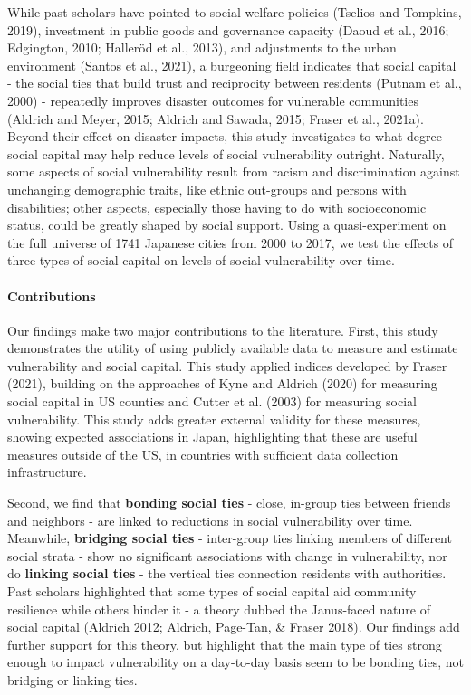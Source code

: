 \documentclass[]{elsarticle} %
\begin{document}
While past scholars have pointed to social welfare policies (Tselios and
Tompkins, 2019), investment in public goods and governance capacity
(Daoud et al., 2016; Edgington, 2010; Halleröd et al., 2013), and
adjustments to the urban environment (Santos et al., 2021), a burgeoning
field indicates that social capital - the social ties that build trust
and reciprocity between residents (Putnam et al., 2000) - repeatedly
improves disaster outcomes for vulnerable communities (Aldrich and
Meyer, 2015; Aldrich and Sawada, 2015; Fraser et al., 2021a). Beyond
their effect on disaster impacts, this study investigates to what degree
social capital may help reduce levels of social vulnerability outright.
Naturally, some aspects of social vulnerability result from racism and
discrimination against unchanging demographic traits, like ethnic
out-groups and persons with disabilities; other aspects, especially
those having to do with socioeconomic status, could be greatly shaped by
social support. Using a quasi-experiment on the full universe of 1741
Japanese cities from 2000 to 2017, we test the effects of three types of
social capital on levels of social vulnerability over time.

\hypertarget{contributions}{%
\paragraph{Contributions}\label{contributions}}

Our findings make two major contributions to the literature. First, this
study demonstrates the utility of using publicly available data to
measure and estimate vulnerability and social capital. This study
applied indices developed by Fraser (2021), building on the approaches
of Kyne and Aldrich (2020) for measuring social capital in US counties
and Cutter et al. (2003) for measuring social vulnerability. This study
adds greater external validity for these measures, showing expected
associations in Japan, highlighting that these are useful measures
outside of the US, in countries with sufficient data collection
infrastructure.

Second, we find that \textbf{bonding social ties} - close, in-group ties
between friends and neighbors - are linked to reductions in social
vulnerability over time. Meanwhile, \textbf{bridging social ties} -
inter-group ties linking members of different social strata - show no
significant associations with change in vulnerability, nor do
\textbf{linking social ties} - the vertical ties connection residents
with authorities. Past scholars highlighted that some types of social
capital aid community resilience while others hinder it - a theory
dubbed the Janus-faced nature of social capital (Aldrich 2012; Aldrich,
Page-Tan, \& Fraser 2018). Our findings add further support for this
theory, but highlight that the main type of ties strong enough to impact
vulnerability on a day-to-day basis seem to be bonding ties, not
bridging or linking ties.
\end{document}
